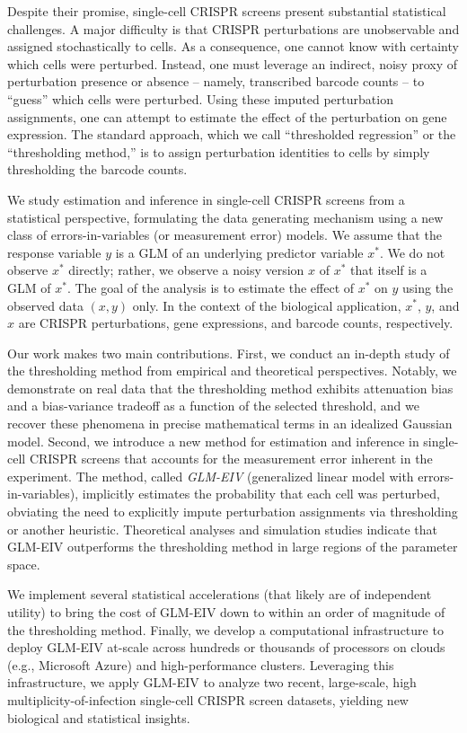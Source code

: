\documentclass[12pt]{article}
\begin{document}
Despite their promise, single-cell CRISPR screens present substantial statistical challenges. A major difficulty is that CRISPR perturbations are unobservable and assigned stochastically to cells. As a consequence, one cannot know with certainty which cells were perturbed. Instead, one must leverage an indirect, noisy proxy of perturbation presence or absence -- namely, transcribed barcode counts -- to ``guess'' which cells were perturbed. Using these imputed perturbation assignments, one can attempt to estimate the effect of the perturbation on gene expression. The standard approach, which we call ``thresholded regression'' or the ``thresholding method,'' is to assign perturbation identities to cells by simply thresholding the barcode counts.

We study estimation and inference in single-cell CRISPR screens from a statistical perspective, formulating the data generating mechanism using a new class of errors-in-variables (or measurement error) models. We assume that the response variable $y$ is a GLM of an underlying predictor variable $x^*$. We do not observe $x^*$ directly; rather, we observe a noisy version $x$ of $x^*$ that itself is a GLM of $x^*$. The goal of the analysis is to estimate the effect of $x^*$ on $y$ using the observed data $(x , y)$ only. In the context of the biological application, $x^*$, $y$, and $x$ are CRISPR perturbations, gene expressions, and barcode counts, respectively.

Our work makes two main contributions. First, we conduct an in-depth study of the thresholding method from empirical and theoretical perspectives. Notably, we demonstrate on real data that the thresholding method exhibits attenuation bias and a bias-variance tradeoff as a function of the selected threshold, and we recover these phenomena in precise mathematical terms in an idealized Gaussian model. Second, we introduce a new method for estimation and inference in single-cell CRISPR screens that accounts for the measurement error inherent in the experiment. The method, called \textit{GLM-EIV} (generalized linear model with errors-in-variables), implicitly estimates the probability that each cell was perturbed, obviating the need to explicitly impute perturbation assignments via thresholding or another heuristic. Theoretical analyses and simulation studies indicate that GLM-EIV outperforms the thresholding method in large regions of the parameter space.

We implement several statistical accelerations (that likely are of independent utility) to bring the cost of GLM-EIV down to within an order of magnitude of the thresholding method. Finally, we develop a computational infrastructure to deploy GLM-EIV at-scale across hundreds or thousands of processors on clouds (e.g., Microsoft Azure) and high-performance clusters. Leveraging this infrastructure, we apply GLM-EIV to analyze two recent, large-scale, high multiplicity-of-infection single-cell CRISPR screen datasets, yielding new biological and statistical insights. 
\end{document}
